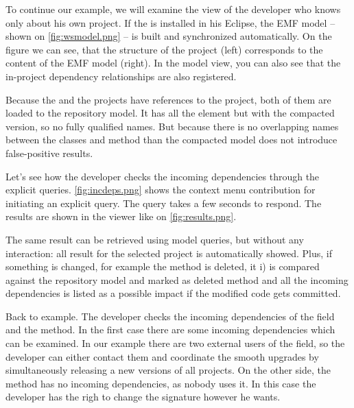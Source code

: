 To continue our example, we will examine the view of the developer who knows
only about his own  project. If the \ptool{} is  installed in his
Eclipse, the EMF model -- shown on \autoref{fig:wsmodel.png}
-- is built and synchronized automatically. On the figure we can see, that the
structure of the project (left) corresponds to the content of the EMF model
(right). In the model view, you can also see that the in-project dependency
relationships are also registered.


Because the  and the  projects have references to the
 project, both of them are loaded to the repository model. It has all the
element but with the compacted version, so no fully qualified names. But because
there is no overlapping names between the classes and method than the compacted
model does not introduce false-positive results.

Let's see how the developer checks the incoming dependencies through the
explicit queries.
\autoref{fig:incdeps.png} shows the context menu contribution for initiating an
explicit query. The query takes a few seconds to respond. The results are shown
in the viewer like on \autoref{fig:results.png}.
 
The same result can be retrieved using model queries, but without any
interaction: all result for the selected project is automatically showed. Plus,
if something is changed, for example the  method is deleted, it
i) is compared against the repository model and marked as deleted method and all
the incoming dependencies is listed as a possible impact if the modified code
gets committed. 

Back to example. The developer checks the incoming dependencies of the
\mbox{} \mbox{} field and the 
method. In the first case there are some incoming dependencies which can be
examined.
In our example there are two external users of the field, so the developer can
either contact them and coordinate the smooth upgrades by simultaneously
releasing a new versions of all projects. On the other side, the
 method has no incoming dependencies, as nobody uses it. In
this case the developer has the righ to change the signature however he wants.


